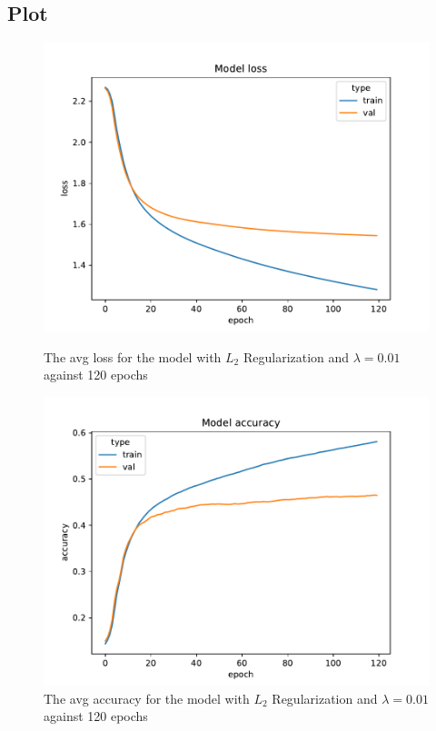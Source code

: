 \documentclass{article}
\begin{document}
    \subsection{Plot}\label{subsec:plot}
    \begin{figure}[H]
        \begin{minipage}[b]{0.5\linewidth}
            \centering
            \includegraphics[width=\textwidth]{../plots/config_2d_L2_-2_0.001_loss}
            \caption{The avg loss for the model with $L_2$ Regularization and $\lambda = 0.01$ against 120 epochs}
            \label{fig:figure3}
        \end{minipage}
        \hspace{0.2cm}
        \begin{minipage}[b]{0.5\linewidth}
            \centering
            \includegraphics[width=\textwidth]{../plots/config_2d_L2_-2_0.001_accuracy}
            \caption{The avg accuracy for the model with $L_2$ Regularization and $\lambda = 0.01$ against 120 epochs}
            \label{fig:figure4}
        \end{minipage}
    \end{figure}
\end{document}
